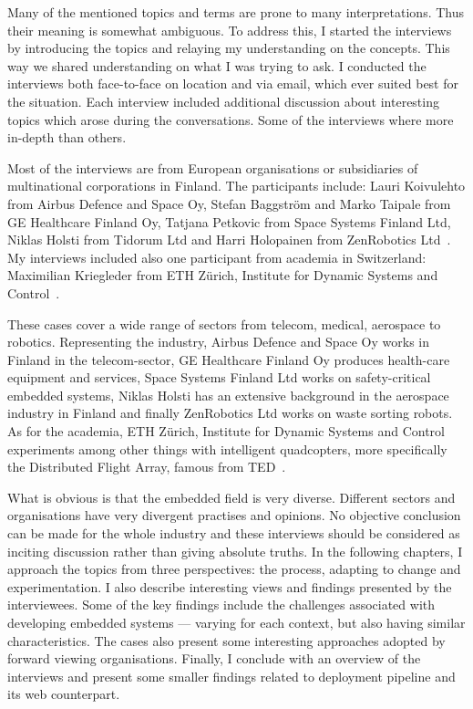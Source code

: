 \documentclass[english]{tktltiki2}
\begin{document}
Many of the mentioned topics and terms are prone to many interpretations. Thus their meaning is somewhat ambiguous. To address this, I started the interviews by introducing the topics and relaying my understanding on the concepts. This way we shared understanding on what I was trying to ask. I conducted the interviews both face-to-face on location and via email, which ever suited best for the situation. Each interview included additional discussion about interesting topics which arose during the conversations. Some of the interviews where more in-depth than others.

Most of the interviews are from European organisations or subsidiaries of multinational corporations in Finland. The participants include: Lauri Koivulehto from Airbus Defence and Space Oy, Stefan Baggström and Marko Taipale from GE Healthcare Finland Oy, Tatjana Petkovic from Space Systems Finland Ltd, Niklas Holsti from Tidorum Ltd and Harri Holopainen from ZenRobotics Ltd~\cite{Koi15, BT15, Pet15, Hol15b, Hol15a}. My interviews included also one participant from academia in Switzerland: Maximilian Kriegleder from ETH Zürich, Institute for Dynamic Systems and Control~\cite{Kri15}.

These cases cover a wide range of sectors from telecom, medical, aerospace to robotics. Representing the industry, Airbus Defence and Space Oy works in Finland in the telecom-sector, GE Healthcare Finland Oy produces health-care equipment and services, Space Systems Finland Ltd works on safety-critical embedded systems, Niklas Holsti has an extensive background in the aerospace industry in Finland and finally ZenRobotics Ltd works on waste sorting robots. As for the academia, ETH Zürich, Institute for Dynamic Systems and Control experiments among other things with intelligent quadcopters, more specifically the Distributed Flight Array, famous from TED~\cite{Dan13}.

What is obvious is that the embedded field is very diverse. Different sectors and organisations have very divergent practises and opinions. No objective conclusion can be made for the whole industry and these interviews should be considered as inciting discussion rather than giving absolute truths. In the following chapters, I approach the topics from three perspectives: the process, adapting to change and experimentation. I also describe interesting views and findings presented by the interviewees. Some of the key findings include the challenges associated with developing embedded systems — varying for each context, but also having similar characteristics. The cases also present some interesting approaches adopted by forward viewing organisations. Finally, I conclude with an overview of the interviews and present some smaller findings related to deployment pipeline and its web counterpart.
\end{document}
